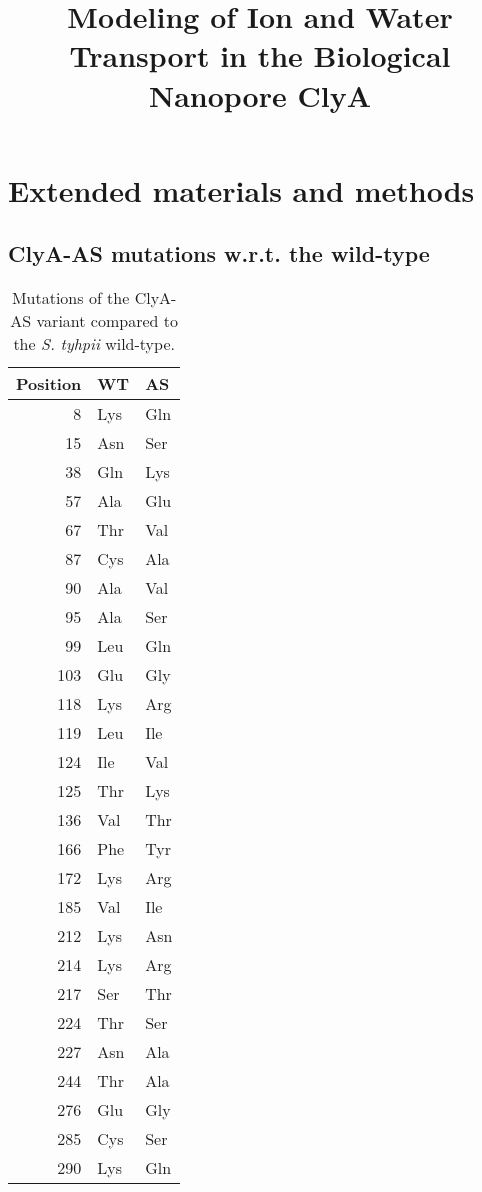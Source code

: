 \documentclass[journal=ancac3, manuscript=suppinfo, etalmode=truncate,maxauthors=0]{achemso}
\title{Modeling of Ion and Water Transport in the Biological Nanopore ClyA}
\begin{document}
\maketitle

\newpage

\tableofcontents

\newpage

\newpage
\section{Extended materials and methods}

\subsection{ClyA-AS mutations w.r.t. the wild-type}

\begin{table*}[h]
	\renewcommand{\arraystretch}{1.5}
	\scriptsize
	\caption{Mutations of the ClyA-AS variant compared to the \textit{S. tyhpii} wild-type.}
	\centering
	\label{tab:clya_as_mutations}
	\begin{tabular}{rll}
		\toprule
		Position	& WT	& AS \\
		\midrule
		8			& Lys	& Gln	\\
		15			& Asn	& Ser	\\
		38			& Gln	& Lys	\\
		57			& Ala	& Glu 	\\
		67			& Thr	& Val 	\\
		87			& Cys	& Ala 	\\
		90			& Ala	& Val	\\
		95			& Ala	& Ser 	\\
		99			& Leu	& Gln 	\\
		103	 		& Glu	& Gly	\\
		118			& Lys	& Arg 	\\
		119			& Leu	& Ile	\\
		124			& Ile	& Val	\\
		125			& Thr	& Lys	\\
		136			& Val	& Thr	\\
		166			& Phe	& Tyr	\\
		172			& Lys	& Arg	\\
		185			& Val	& Ile	\\
		212			& Lys	& Asn	\\
		214			& Lys	& Arg	\\
		217			& Ser	& Thr	\\
		224			& Thr	& Ser	\\
		227			& Asn	& Ala	\\
		244			& Thr 	& Ala	\\
		276			& Glu	& Gly	\\
		285			& Cys	& Ser	\\
		290			& Lys	& Gln	\\
		\bottomrule
	\end{tabular}
\end{table*}
\end{document}
